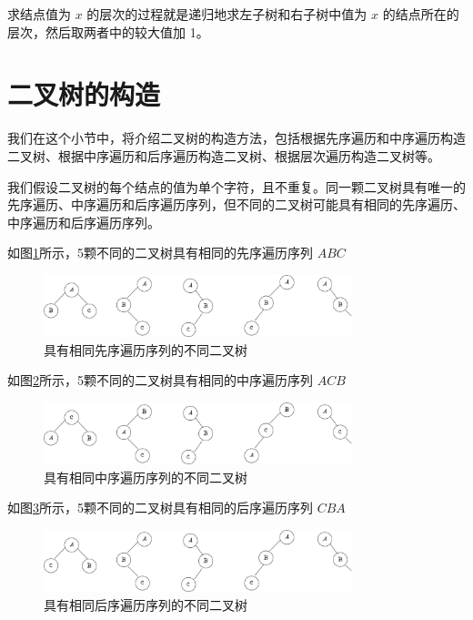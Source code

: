 \documentclass[lang=cn,newtx,10pt,scheme=chinese]{../elegantbook}
\begin{document}
求结点值为 $x$ 的层次的过程就是递归地求左子树和右子树中值为 $x$ 的结点所在的层次，然后取两者中的较大值加 1。


\section{二叉树的构造}

我们在这个小节中，将介绍二叉树的构造方法，包括根据先序遍历和中序遍历构造二叉树、根据中序遍历和后序遍历构造二叉树、根据层次遍历构造二叉树等。

我们假设二叉树的每个结点的值为单个字符，且不重复。同一颗二叉树具有唯一的先序遍历、中序遍历和后序遍历序列，但不同的二叉树可能具有相同的先序遍历、中序遍历和后序遍历序列。

如图\ref{fig:samePre}所示，5颗不同的二叉树具有相同的先序遍历序列 $ABC$

\begin{figure}[h]
  \centering
  \includegraphics[width=0.8\textwidth]{./figure/pdf/cropped/preBTree.pdf}
  \caption{具有相同先序遍历序列的不同二叉树}
  \label{fig:samePre}
\end{figure}

如图\ref{fig:sameIn}所示，5颗不同的二叉树具有相同的中序遍历序列 $ACB$

\begin{figure}[h]
  \centering
  \includegraphics[width=0.8\textwidth]{./figure/pdf/cropped/inBTree.pdf}
  \caption{具有相同中序遍历序列的不同二叉树}
  \label{fig:sameIn}
\end{figure}

如图\ref{fig:samePost}所示，5颗不同的二叉树具有相同的后序遍历序列 $CBA$

\begin{figure}[h]
  \centering
  \includegraphics[width=0.8\textwidth]{./figure/pdf/cropped/postBTree.pdf}
  \caption{具有相同后序遍历序列的不同二叉树}
  \label{fig:samePost}
\end{figure}
\end{document}
